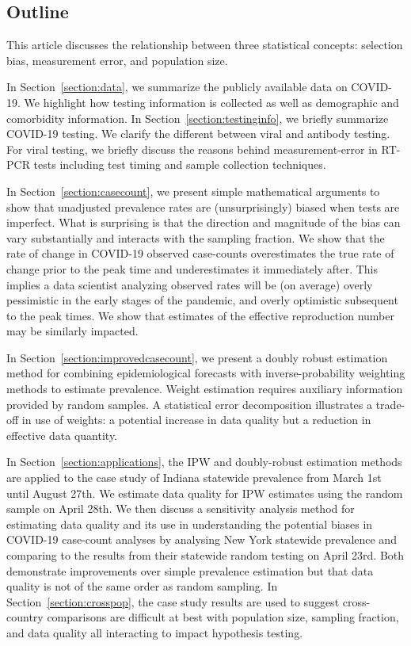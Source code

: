 \documentclass[11pt]{amsart}
\begin{document}
\subsection{Outline}

This article discusses the relationship between three statistical concepts: selection bias, measurement error, and population size.

In Section~\ref{section:data}, we summarize the publicly available data on COVID-19.  We highlight how testing information is collected as well as demographic and comorbidity information.  In Section~\ref{section:testinginfo}, we briefly summarize COVID-19 testing.  We clarify the different between viral and antibody testing.  For viral testing, we briefly discuss the reasons behind measurement-error in RT-PCR tests including test timing and sample collection techniques.

In Section~\ref{section:casecount}, we present simple mathematical arguments to show that unadjusted prevalence rates are (unsurprisingly) biased when tests are imperfect. What is surprising is that the direction and magnitude of the bias can vary substantially and interacts with the sampling fraction.  We show that the rate of change in COVID-19 observed case-counts overestimates the true rate of change prior to the peak time and underestimates it immediately after.  This implies a data scientist analyzing observed rates will be (on average) overly pessimistic in the early stages of the pandemic, and overly optimistic subsequent to the peak times.  We show that estimates of the effective reproduction number may be similarly impacted.

In Section~\ref{section:improvedcasecount}, we present a doubly robust estimation method for combining epidemiological forecasts with inverse-probability weighting methods to estimate prevalence.  Weight estimation requires auxiliary information provided by random samples.  A statistical error decomposition illustrates a trade-off in use of weights: a potential increase in data quality but a reduction in effective data quantity.

In Section~\ref{section:applications}, the IPW and doubly-robust estimation methods are applied to the case study of Indiana statewide prevalence from March 1st until August 27th.  We estimate data quality for IPW estimates using the random sample on April 28th.  We then discuss a sensitivity analysis method for estimating data quality and its use in understanding the potential biases in COVID-19 case-count analyses by analysing New York statewide prevalence and comparing to the results from their statewide random testing on April 23rd.  Both demonstrate improvements over simple prevalence estimation but that data quality is not of the same order as random sampling.  In Section~\ref{section:crosspop}, the case study results are used to suggest cross-country comparisons are difficult at best with population size, sampling fraction, and data quality all interacting to impact hypothesis testing.
\end{document}
